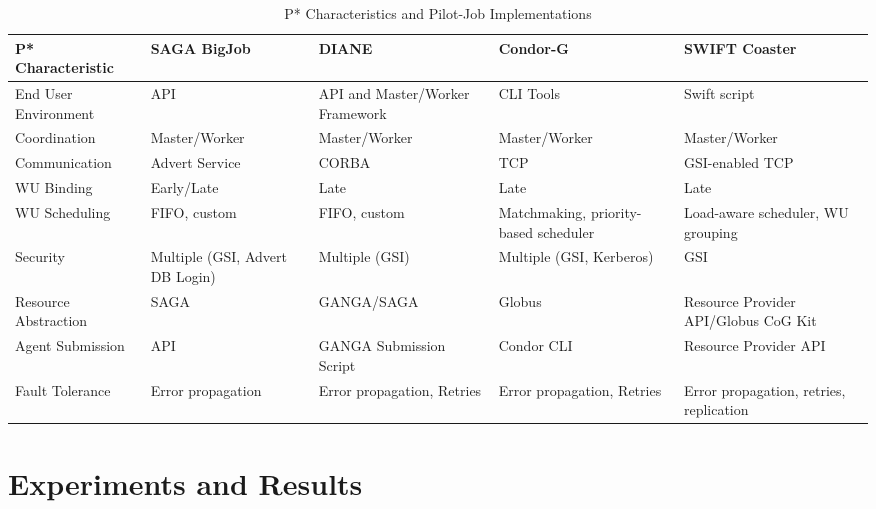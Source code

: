 \documentclass[conference,final]{IEEEtran}
\newcommand{\up}{\vspace*{-1em}}
\newcommand{\upp}{\vspace*{-0.5em}}
\begin{document}
\begin{table}[t]
\centering
\begin{tabular}{|l|p{2.5cm}|p{2.5cm}|p{2.5cm}|p{2.5cm}|}
	\hline
	\textbf{P* Characteristic}
	&\textbf{SAGA BigJob} &\textbf{DIANE} &\textbf{Condor-G} &   
	\textbf{SWIFT Coaster} \\ \hline
End User Environment &API &API and Master/Worker Framework &CLI Tools &Swift script\\ \hline

Coordination &Master/Worker  &Master/Worker  &Master/Worker &Master/Worker \\ \hline
	
Communication &Advert Service &CORBA &TCP &GSI-enabled TCP \\ \hline

WU Binding &Early/Late &Late &Late &Late\\
\hline
WU Scheduling &FIFO, custom &FIFO, custom &Matchmaking, priority-based scheduler 
&Load-aware scheduler, WU grouping\\
\hline

Security &Multiple (GSI, Advert DB Login) &Multiple (GSI) &Multiple (GSI, 
Kerberos) &GSI\\ \hline

Resource Abstraction &SAGA &GANGA/SAGA &Globus &Resource Provider API/Globus CoG 
Kit \\ 
\hline
Agent Submission &API &GANGA Submission Script &Condor CLI 
&Resource Provider API\\
\hline
Fault Tolerance &Error propagation &Error propagation, Retries &Error propagation, Retries &Error propagation, retries, replication\\
\hline
	
\end{tabular}
\caption{P* Characteristics and Pilot-Job Implementations\up}\label{table:pilot-job-comparison}
\end{table}

\upp
\section{Experiments and Results\upp\upp}
\end{document}
